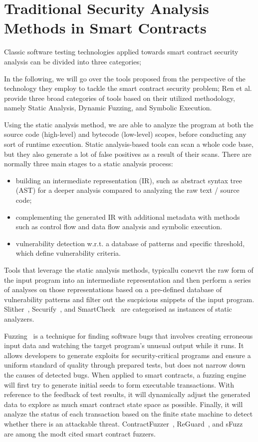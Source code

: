 \section{Traditional Security Analysis Methods in Smart Contracts}

Classic software testing technologies applied towards smart contract security analysis can be divided into three categories;

In the following, we will go over the tools proposed from the perspective of the technology they employ to tackle the smart contract security problem;
Ren et al.~\cite{Empirical-Evaluation-of-Smart-Contract-Testing:What-is-the-Best-Choice} provide three broad categories of tools based on their utilized methodology,
namely Static Analysis, Dynamic Fuzzing, and Symbolic Execution.

Using the static analysis method, we are able to analyze the program at both the source code (high-level) and bytecode (low-level) scopes, before conducting any sort of runtime execution.
Static analysis-based tools can scan a whole code base, but they also generate a lot of false positives as a result of their scans.
There are normally three main stages to a static analysis process:
\begin{itemize}
  \item building an intermediate representation (IR), such as abstract syntax tree (AST) for a deeper analysis compared to analyzing the raw text / source code;
  \item complementing the generated IR with additional metadata with methods such as control flow and data flow analysis and symbolic execution.
  \item vulnerability detection w.r.t. a database of patterns and specific threshold, which define vulnerability criteria.
\end{itemize}
Tools that leverage the static analysis methods, typicallu conevrt the raw form of the input program into an intermediate representation and then perform a series of analyses on those representations based on a pre-defined database of vulnerability patterns and filter out the sucpicious snippets of the input program.
Slither~\cite{slither}, Securify~\cite{securify}, and SmartCheck~\cite{securify} are categorised as instances of static analyzers.

Fuzzing~\cite{chen2018systematic} is a technique for finding software bugs that involves creating erroneous input data and watching the target program's unusual output while it runs.
It allows developers to generate exploits for security-critical programs and ensure a uniform standard of quality through prepared tests, but does not narrow down the causes of detected bugs.
When applied to smart contracts, a fuzzing engine will first try to generate initial seeds to form executable transactions. With reference to the feedback of test results,
it will dynamically adjust the generated data to explore as much smart contract state space as possible.
Finally, it will analyze the status of each transaction based on the finite state machine to detect whether there is an attackable threat.
ContractFuzzer~\cite{contractfuzzer}, ReGuard~\cite{liu2018reguard}, and sFuzz~\cite{nguyen2020sfuzz} are among the modt cited smart contract fuzzers.

